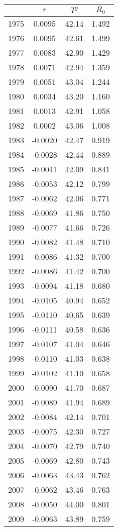 \begin{tabular}{cccc}
  \hline
 & $r$ & $T^y$ & $R_0$ \\ 
  \hline
1975 & 0.0095 & 42.14 & 1.492 \\ 
  1976 & 0.0095 & 42.61 & 1.499 \\ 
  1977 & 0.0083 & 42.90 & 1.429 \\ 
  1978 & 0.0071 & 42.94 & 1.359 \\ 
  1979 & 0.0051 & 43.04 & 1.244 \\ 
  1980 & 0.0034 & 43.20 & 1.160 \\ 
  1981 & 0.0013 & 42.91 & 1.058 \\ 
  1982 & 0.0002 & 43.06 & 1.008 \\ 
  1983 & -0.0020 & 42.47 & 0.919 \\ 
  1984 & -0.0028 & 42.44 & 0.889 \\ 
  1985 & -0.0041 & 42.09 & 0.841 \\ 
  1986 & -0.0053 & 42.12 & 0.799 \\ 
  1987 & -0.0062 & 42.06 & 0.771 \\ 
  1988 & -0.0069 & 41.86 & 0.750 \\ 
  1989 & -0.0077 & 41.66 & 0.726 \\ 
  1990 & -0.0082 & 41.48 & 0.710 \\ 
  1991 & -0.0086 & 41.32 & 0.700 \\ 
  1992 & -0.0086 & 41.42 & 0.700 \\ 
  1993 & -0.0094 & 41.18 & 0.680 \\ 
  1994 & -0.0105 & 40.94 & 0.652 \\ 
  1995 & -0.0110 & 40.65 & 0.639 \\ 
  1996 & -0.0111 & 40.58 & 0.636 \\ 
  1997 & -0.0107 & 41.04 & 0.646 \\ 
  1998 & -0.0110 & 41.03 & 0.638 \\ 
  1999 & -0.0102 & 41.10 & 0.658 \\ 
  2000 & -0.0090 & 41.70 & 0.687 \\ 
  2001 & -0.0089 & 41.94 & 0.689 \\ 
  2002 & -0.0084 & 42.14 & 0.701 \\ 
  2003 & -0.0075 & 42.30 & 0.727 \\ 
  2004 & -0.0070 & 42.79 & 0.740 \\ 
  2005 & -0.0069 & 42.80 & 0.743 \\ 
  2006 & -0.0063 & 43.43 & 0.762 \\ 
  2007 & -0.0062 & 43.46 & 0.763 \\ 
  2008 & -0.0050 & 44.00 & 0.801 \\ 
  2009 & -0.0063 & 43.89 & 0.759 \\ 
   \hline
\end{tabular}
